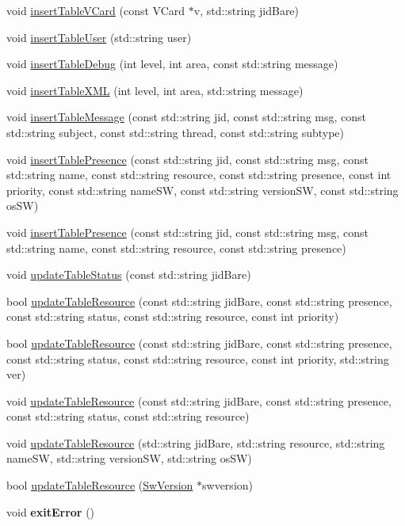 \begin{DoxyCompactItemize}
\item 
void \hyperlink{classDatabase_a1bc61aab7507950d0cca002b05693fd1}{insertTableVCard} (const VCard $\ast$v, std::string jidBare)
\item 
void \hyperlink{classDatabase_ae3d08a778ad3e3bb916b9a0710e17591}{insertTableUser} (std::string user)
\item 
void \hyperlink{classDatabase_adf308c272ed2354c9b4b0adec7e7514c}{insertTableDebug} (int level, int area, const std::string message)
\item 
void \hyperlink{classDatabase_a91c467c7d88fa73d47f90b00810639ce}{insertTableXML} (int level, int area, std::string message)
\item 
void \hyperlink{classDatabase_a9d4abee71fe85d95e34537212a2b1860}{insertTableMessage} (const std::string jid, const std::string msg, const std::string subject, const std::string thread, const std::string subtype)
\item 
void \hyperlink{classDatabase_ac224d84f32afe5b4700339b4ed1cbcba}{insertTablePresence} (const std::string jid, const std::string msg, const std::string name, const std::string resource, const std::string presence, const int priority, const std::string nameSW, const std::string versionSW, const std::string osSW)
\item 
void \hyperlink{classDatabase_a23e89aa424f735e5510760e6dcb5e7ae}{insertTablePresence} (const std::string jid, const std::string msg, const std::string name, const std::string resource, const std::string presence)
\item 
void \hyperlink{classDatabase_a277f3480f7ac16380ea0195d2a3d1c14}{updateTableStatus} (const std::string jidBare)
\item 
bool \hyperlink{classDatabase_af70354123caedcc69d3ce905e04c35ff}{updateTableResource} (const std::string jidBare, const std::string presence, const std::string status, const std::string resource, const int priority)
\item 
bool \hyperlink{classDatabase_a808c8a5de4206ca72a69a122b8832811}{updateTableResource} (const std::string jidBare, const std::string presence, const std::string status, const std::string resource, const int priority, std::string ver)
\item 
void \hyperlink{classDatabase_a9abb11cd73e399d8f872ed6a19ff1d0c}{updateTableResource} (const std::string jidBare, const std::string presence, const std::string status, const std::string resource)
\item 
void \hyperlink{classDatabase_a3d21c62cf45f895d5bea438b1279370d}{updateTableResource} (std::string jidBare, std::string resource, std::string nameSW, std::string versionSW, std::string osSW)
\item 
bool \hyperlink{classDatabase_ae80a2a2b6a33748bee20b62780f43fc3}{updateTableResource} (\hyperlink{classSwVersion}{SwVersion} $\ast$swversion)
\item 
\hypertarget{classDatabase_ae59c31d44f6b09b22edc7173f0d7f18d}{
void {\bfseries exitError} ()}
\label{classDatabase_ae59c31d44f6b09b22edc7173f0d7f18d}


\end{DoxyCompactItemize}
